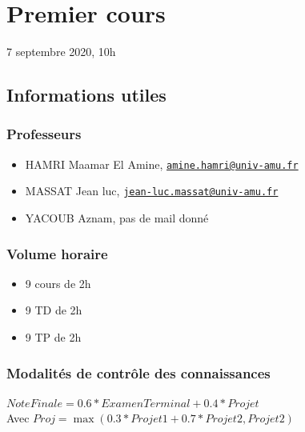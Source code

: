 \hypertarget{introduction}{%
\section{Premier cours}\label{Premier cour}}

7 septembre 2020, 10h

\hypertarget{informations-utiles}{%
\subsection{Informations utiles}\label{informations-utiles}}

\hypertarget{professeurs}{%
\subsubsection{Professeurs}\label{professeurs}}

\begin{itemize}
\tightlist
\item
  HAMRI Maamar El Amine,
  \href{mailto:amine.hamri@univ-amu.fr}{\nolinkurl{amine.hamri@univ-amu.fr}}
\item
  MASSAT Jean luc,
  \href{mailto:jean-luc.massat@univ-amu.fr}{\nolinkurl{jean-luc.massat@univ-amu.fr}}
\item
  YACOUB Aznam, pas de mail donné
\end{itemize}

\hypertarget{volume-horaire}{%
\subsubsection{Volume horaire}\label{volume-horaire}}

\begin{itemize}
\tightlist
\item
  9 cours de 2h
\item
  9 TD de 2h
\item
  9 TP de 2h
\end{itemize}

\hypertarget{modalituxe9s-de-contruxf4le-des-connaissances}{%
\subsubsection{Modalités de contrôle des
connaissances}\label{modalituxe9s-de-contruxf4le-des-connaissances}}

\(NoteFinale = 0.6 * ExamenTerminal + 0.4 * Projet\) \\

Avec \(Proj = \max(0.3 * Projet1 + 0.7 * Projet2, Projet2)\)

